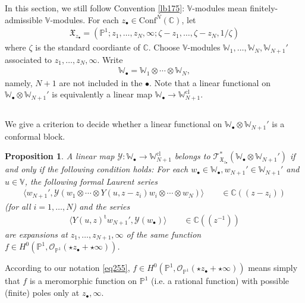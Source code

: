 \documentclass[12pt,a4paper,notitlepage]{article}
\theoremstyle{definition}
\theoremstyle{plain}
\newtheorem{pp}[df]{Proposition}
\newcommand{\fk}{\mathfrak}
\newcommand{\mc}{\mathcal}
\newcommand{\tr}{\mathrm{t}} %
\newcommand{\Conf}{\mathrm{Conf}}
\newcommand{\bigbk}[1]{\big\langle {#1}\big\rangle}
\newcommand{\scr}{\mathscr}
\newcommand{\blt}{\bullet}
\newcommand{\Vbb}{\mathbb V}
\newcommand{\Wbb}{\mathbb W}
\newcommand{\Cbb}{\mathbb C}
\newcommand{\Pbb}{\mathbb P}
\newcommand{\cl}{\mathrm{cl}}
\numberwithin{equation}{section}
\begin{document}
In this section, we still follow Convention \ref{lb175}: $\Vbb$-modules mean finitely-admissible $\Vbb$-modules. For each $z_\blt\in\Conf^N(\Cbb)$, let
\begin{align*}
\fk X_{z_\blt}=(\Pbb^1;z_1,\dots,z_N,\infty;\zeta-z_1,\dots,\zeta-z_N,1/\zeta)
\end{align*}
where $\zeta$ is the standard coordiante of $\Cbb$. Choose $\Vbb$-modules $\Wbb_1,\dots,\Wbb_N,\Wbb_{N+1}'$ associated to $z_1,\dots,z_N,\infty$. Write
\begin{align*}
\Wbb_\blt=\Wbb_1\otimes\cdots\otimes\Wbb_N,
\end{align*}
namely, $N+1$ are not included in the $\blt$. Note that a linear functional on $\Wbb_\blt\otimes\Wbb_{N+1}'$ is equivalently a linear map $\Wbb_\blt\rightarrow\Wbb_{N+1}^\cl$.





\subsection{}

We give a criterion to decide whether a linear functional on $\Wbb_\blt\otimes\Wbb_{N+1}'$ is a conformal block.

\begin{pp}\label{lb176}
A linear map $\mc Y:\Wbb_\blt\rightarrow\Wbb_{N+1}^\cl$ belongs to $\scr T_{\fk X_{z_\blt}}^*(\Wbb_\blt\otimes\Wbb_{N+1}')$ if and only if the following condition holds: For each $w_\blt\in\Wbb_\blt,w_{N+1}'\in\Wbb_{N+1}'$ and $u\in\Vbb$, the following formal Laurent series
\begin{gather*}
\bigbk{w_{N+1}',\mc Y(w_1\otimes\cdots\otimes Y(u,z-z_i)w_i\otimes\cdots\otimes w_N)}\qquad \in\Cbb((z-z_i))
\end{gather*}
(for all $i=1,\dots,N$) and the series
\begin{align*}
\bigbk{Y(u,z)^\tr w_{N+1}',\mc Y(w_\blt)}\qquad\in\Cbb((z^{-1}))
\end{align*}
are expansions at $z_1,\dots,z_{N+1},\infty$ of the same function $f\in H^0(\Pbb^1,\scr O_{\Pbb^1}(\star z_\blt+\star\infty))$.
\end{pp}

According to our notation \eqref{eq255}, $f\in H^0(\Pbb^1,\scr O_{\Pbb^1}(\star z_\blt+\star\infty))$ means simply that $f$ is a meromorphic  function on $\Pbb^1$ (i.e. a rational function) with possible (finite) poles only at $z_\blt,\infty$.
\end{document}
